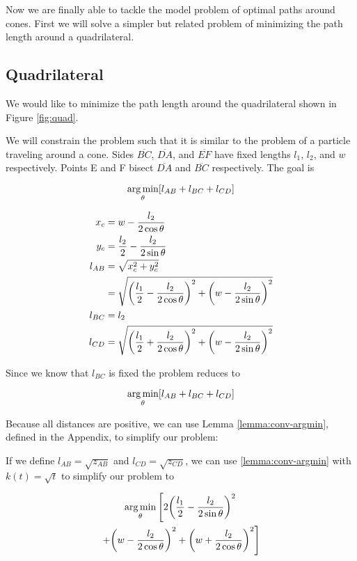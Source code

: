 Now we are finally able to tackle the model problem of optimal paths around cones. First we will solve a simpler but related problem of minimizing the path length around a quadrilateral.

\subsection{Quadrilateral}

We would like to minimize the path length around the quadrilateral shown in Figure \ref{fig:quad}.


We will constrain the problem such that it is similar to the problem of a particle traveling around a cone. Sides $\overline{BC}$, $\overline{DA}$, and $\overline{EF}$ have fixed lengths $l_1$, $l_2$, and $w$ respectively. Points E and F bisect $\overline{DA}$ and $\overline{BC}$ respectively. The goal is

\[
\argmin_{\theta} \bracket{l_{AB} + l_{BC} + l_{CD}}
\]

\begin{align}
  x_c& = w - \frac{l_2}{2 \cos{\theta}}\\
  y_c& = \frac{l_2}{2} - \frac{l_2}{2 \sin{\theta}}\\
  l_{AB}& = \sqrt{x_c^2 + y_c^2}\\
  & = \sqrt{ \paren{\frac{l_1}{2} - \frac{l_2}{2 \cos\theta}}^2 + \paren{w - \frac{l_2}{2 \sin\theta}}^2 }\\
  l_{BC}& = l_2\\
  l_{CD}& = \sqrt{\paren{\frac{l_1}{2} + \frac{l_2}{2 \cos\theta}}^2 + \paren{w - \frac{l_2}{2 \sin\theta}}^2 }
\end{align}

Since we know that $l_{BC}$ is fixed the problem reduces to

\[
\argmin_{\theta} \bracket{l_{AB} + l_{BC} + l_{CD}}
\]

Because all distances are positive, we can use Lemma \ref{lemma:conv-argmin}, defined in the Appendix, to simplify our problem:

If we define $l_{AB} = \sqrt{z_{AB}}$ and $l_{CD} = \sqrt{z_{CD}}$, we can use \ref{lemma:conv-argmin} with $k(t) = \sqrt{t}$ to simplify our problem to

\begin{multline}
  \argmin_{\theta} \left[ 2\paren{\frac{l_1}{2} - \frac{l_2}{2 \sin\theta}}^2 \right.\\
  \left. + \paren{w - \frac{l_2}{2 \cos\theta}}^2 + \paren{w + \frac{l_2}{2 \cos\theta}}^2 \right]
\end{multline}


